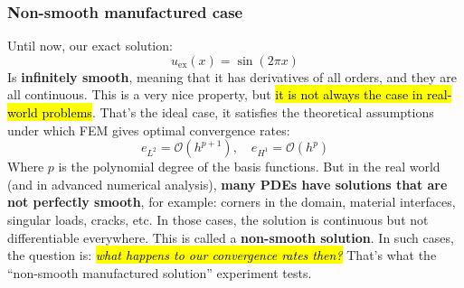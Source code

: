 \subsubsection{Non-smooth manufactured case}\label{sec:non-smooth-manufactured-case}

Until now, our exact solution:
\begin{equation*}
    u_{\text{ex}}(x) = \sin\left(2\pi x\right)
\end{equation*}
Is \textbf{infinitely smooth}, meaning that it has derivatives of all orders, and they are all continuous. This is a very nice property, but \hl{it is not always the case in real-world problems}. That's the ideal case, it satisfies the theoretical assumptions under which FEM gives optimal convergence rates:
\begin{equation*}
    e_{L^2} = \mathcal{O}(h^{p+1}), \quad e_{H^1} = \mathcal{O}(h^p)
\end{equation*}
Where $p$ is the polynomial degree of the basis functions. But in the real world (and in advanced numerical analysis), \textbf{many PDEs have solutions that are not perfectly smooth}, for example: corners in the domain, material interfaces, singular loads, cracks, etc. In those cases, the solution is continuous but not differentiable everywhere. This is called a \textbf{non-smooth solution}. In such cases, the question is: \hl{\emph{what happens to our convergence rates then?}} That's what the ``non-smooth manufactured solution'' experiment tests.

